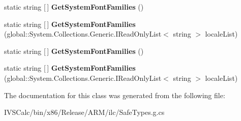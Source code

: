 \begin{DoxyCompactItemize}
\item 
\mbox{\label{class_microsoft_1_1_graphics_1_1_canvas_1_1_text_1_1_canvas_text_format_aef2dd80c00156eb603c71c32191c2972}} 
static string \mbox{[}$\,$\mbox{]} {\bfseries Get\+System\+Font\+Families} ()
\item 
\mbox{\label{class_microsoft_1_1_graphics_1_1_canvas_1_1_text_1_1_canvas_text_format_a66c03578106f9f7b8f72955158707980}} 
static string \mbox{[}$\,$\mbox{]} {\bfseries Get\+System\+Font\+Families} (global\+::\+System.\+Collections.\+Generic.\+I\+Read\+Only\+List$<$ string $>$ locale\+List)
\item 
\mbox{\label{class_microsoft_1_1_graphics_1_1_canvas_1_1_text_1_1_canvas_text_format_aef2dd80c00156eb603c71c32191c2972}} 
static string \mbox{[}$\,$\mbox{]} {\bfseries Get\+System\+Font\+Families} ()
\item 
\mbox{\label{class_microsoft_1_1_graphics_1_1_canvas_1_1_text_1_1_canvas_text_format_a66c03578106f9f7b8f72955158707980}} 
static string \mbox{[}$\,$\mbox{]} {\bfseries Get\+System\+Font\+Families} (global\+::\+System.\+Collections.\+Generic.\+I\+Read\+Only\+List$<$ string $>$ locale\+List)
\end{DoxyCompactItemize}


The documentation for this class was generated from the following file\+:\begin{DoxyCompactItemize}
\item 
I\+V\+S\+Calc/bin/x86/\+Release/\+A\+R\+M/ilc/Safe\+Types.\+g.\+cs\end{DoxyCompactItemize}
